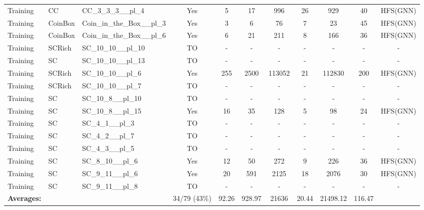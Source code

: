 \documentclass{article}
\begin{document}
\begin{tabular}{lllcccccccc}
Training & CC & CC\_3\_3\_3\_\_pl\_4 & Yes & 5 & 17 & 996 & 26 & 929 & 40 & HFS(GNN) \\
Training & CoinBox & Coin\_in\_the\_Box\_\_pl\_3 & Yes & 3 & 6 & 76 & 7 & 23 & 45 & HFS(GNN) \\
Training & CoinBox & Coin\_in\_the\_Box\_\_pl\_6 & Yes & 6 & 21 & 211 & 8 & 166 & 36 & HFS(GNN) \\
Training & SCRich & SC\_10\_10\_\_pl\_10 & TO & - & - & - & - & - & - & - \\
Training & SC & SC\_10\_10\_\_pl\_13 & TO & - & - & - & - & - & - & - \\
Training & SCRich & SC\_10\_10\_\_pl\_6 & Yes & 255 & 2500 & 113052 & 21 & 112830 & 200 & HFS(GNN) \\
Training & SCRich & SC\_10\_10\_\_pl\_7 & TO & - & - & - & - & - & - & - \\
Training & SC & SC\_10\_8\_\_pl\_10 & TO & - & - & - & - & - & - & - \\
Training & SC & SC\_10\_8\_\_pl\_15 & Yes & 16 & 35 & 128 & 5 & 98 & 24 & HFS(GNN) \\
Training & SC & SC\_4\_1\_\_pl\_3 & TO & - & - & - & - & - & - & - \\
Training & SC & SC\_4\_2\_\_pl\_7 & TO & - & - & - & - & - & - & - \\
Training & SC & SC\_4\_3\_\_pl\_5 & TO & - & - & - & - & - & - & - \\
Training & SC & SC\_8\_10\_\_pl\_6 & Yes & 12 & 50 & 272 & 9 & 226 & 36 & HFS(GNN) \\
Training & SC & SC\_9\_11\_\_pl\_6 & Yes & 20 & 591 & 2125 & 18 & 2076 & 30 & HFS(GNN) \\
Training & SC & SC\_9\_11\_\_pl\_8 & TO & - & - & - & - & - & - & - \\
\textbf{Averages:} & & & 34/79 (43\%) & 92.26 & 928.97 & 21636 & 20.44 & 21498.12 & 116.47 & \\
\bottomrule
\end{tabular}
\newpage
\end{document}

